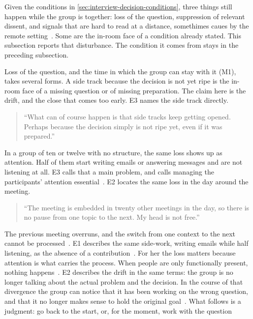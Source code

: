 Given the conditions in \autoref{sec:interview-decision-conditions}, three things still happen
while the group is together: loss of the question, suppression of relevant dissent, and
signals that are hard to read at a distance, somethimes caues by the remote setting~.
Some are the in-room face of a condition already stated.
This subsection reports that disturbance.
The condition it comes from stays in the preceding subsection.

Loss of the question, and the time in which the group can stay with it (M1), takes several forms.
A side track because the decision is not yet ripe is the in-room face of a missing question or
of missing preparation.
The claim here is the drift, and the close that comes too early.
E3 names the side track directly.
{\setlength{\topsep}{0.25\baselineskip}\setlength{\partopsep}{0pt}%
  \begin{quote}\small
    \enquote{What can of course happen is that side tracks keep getting opened. Perhaps because
    the decision simply is not ripe yet, even if it was prepared.}~
\end{quote}}
In a group of ten or twelve with no structure, the same loss shows up as attention.
Half of them start writing emails or answering messages and are not listening at all.
E3 calls that a main problem, and calls managing the participants' attention
essential~.
E2 locates the same loss in the day around the meeting.
{\setlength{\topsep}{0.25\baselineskip}\setlength{\partopsep}{0pt}%
  \begin{quote}\small
    \enquote{The meeting is embedded in twenty other meetings in the day, so there is no pause
    from one topic to the next. My head is not free.}~
\end{quote}}
The previous meeting overruns, and the switch from one context to the next cannot be
processed~.
E1 describes the same side-work, writing emails while half listening, as the absence of a
contribution~.
For her the loss matters because attention is what carries the process.
When people are only functionally present, nothing happens~.
E2 describes the drift in the same terms: the group is no longer talking about the actual
problem and the decision.
In the course of that divergence the group can notice that it has been working on the wrong
question, and that it no longer makes sense to hold the original goal~.
What follows is a judgment: go back to the start, or, for the moment, work with the question
